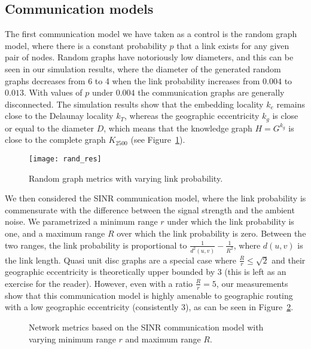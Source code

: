 \documentclass{article}
\begin{document}
\subsection{Communication models}
\label{sub_model}
The first communication model we have taken as a control is the random graph model, where there is a constant probability $p$ that a link exists for any given pair of nodes. Random graphs have notoriously low diameters, and this can be seen in our simulation results, where the diameter of the generated random graphs decreases from 6 to 4 when the link probability increases from $0.004$ to $0.013$. With values of $p$ under $0.004$ the communication graphs are generally disconnected. The simulation results show that the embedding locality $k_e$ remains close to the Delaunay locality $k_T$, whereas the geographic eccentricity $k_g$ is close or equal to the diameter $D$, which means that the knowledge graph $H=G^{k_g}$ is close to the complete graph $K_{2500}$ (see Figure~\ref{fig_rand}).
\begin{figure}[h]
\begin{center}
\texttt{[image: rand\_res]}
\caption{Random graph metrics with varying link probability.}
\label{fig_rand}
\end {center}
\end{figure}

We then considered the SINR communication model, where the link probability is commensurate with the difference between the signal strength and the ambient noise. We parametrized a minimum range $r$ under which the link probability is one, and a maximum range $R$ over which the link probability is zero. Between the two ranges, the link probability is proportional to $\frac{1}{d^2(u,v)}-\frac{1}{R^2}$, where $d(u,v)$ is the link length. Quasi unit disc graphs are a special case where $\frac{R}{r}\leq \sqrt{2}$ and their geographic eccentricity is theoretically upper bounded by 3 (this is left as an exercise for the reader). However, even with a ratio $\frac{R}{r}=5$, our measurements show that this communication model is highly amenable to geographic routing with a low geographic eccentricity (consistently 3), as can be seen in Figure~\ref{fig_sinr}.
\begin{figure}[h]
\begin{center}
\caption{Network metrics based on the SINR communication model with varying minimum range $r$ and maximum range $R$.}
\label{fig_sinr}
\end{center}
\end{figure}
\end{document}
